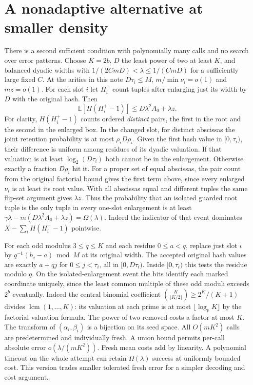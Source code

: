 \documentclass[11pt]{article}
\newcommand{\E}{\mathbb E}
\begin{document}
\section{A nonadaptive alternative at smaller density}
There is a second sufficient condition with polynomially many calls
and no search over error patterns. Choose $K=2b$, $D$ the least power
of two at least $K$, and balanced dyadic widths with
$1/(2CmD)<\lambda\le1/(CmD)$ for a sufficiently large fixed $C$.
At the arities in this note $D\tau_i\le M$, $m/\min\nu_i=o(1)$
and $mz=o(1)$. For each slot $i$ let $H_i^+$ count tuples after
enlarging just its width by $D$ with the original hash. Then
\[
 \E[H(H_i^+-1)]\le D\lambda^2 A_0+\lambda z .
\]
For clarity, $H(H_i^+-1)$ counts ordered \emph{distinct} pairs, the
first in the root and the second in the enlarged box. In the changed
slot, for distinct abscissas the joint retention probability is at
most $\rho_i D\rho_i$. Given the first hash value in $[0,\tau_i)$,
their difference is uniform among residues of its dyadic valuation.
If that valuation is at least $\log_2(D\tau_i)$ both cannot be in the
enlargement. Otherwise exactly a fraction $D\rho_i$ hit it. For a
proper set of equal abscissas, the pair count from the original
factorial bound gives the first term above, since every enlarged
$\nu_i$ is at least its root value. With all abscissas equal and
different tuples the same flip-set argument gives $\lambda z$.
Thus the probability that an isolated guarded root tuple is the
only tuple in every one-slot enlargement is at least
$\gamma\lambda-m(D\lambda^2 A_0+\lambda z)=\Omega(\lambda)$.
Indeed the indicator of that event dominates
$X-\sum_i H(H_i^+-1)$ pointwise.

For each odd modulus $3\le q\le K$ and each residue $0\le a<q$,
replace just slot $i$ by $q^{-1}(h_i-a)\bmod M$ at its original width.
The accepted original hash values are exactly $a+qj$ for
$0\le j<\tau_i$, all in $[0,D\tau_i)$. Inside $[0,\tau_i)$ this tests
the residue modulo $q$. On the isolated-enlargement event the bits
identify each marked coordinate uniquely, since the least common
multiple of these odd moduli exceeds $2^b$ eventually. Indeed the
central binomial coefficient $\binom K{\lfloor K/2\rfloor}\ge2^K/(K+1)$
divides $\operatorname{lcm}(1,\ldots,K)$: its valuation at each prime
is at most $\lfloor\log_p K\rfloor$ by the factorial valuation formula.
The power of two removed costs a factor at most $K$.
The transform of $(\alpha_i,\beta_i)$ is a bijection on its seed
space. All $O(mK^2)$ calls are predetermined and individually fresh.
A union bound permits per-call absolute error $o(\lambda/(mK^2))$.
Fresh mean costs add by linearity. A polynomial timeout on the whole
attempt can retain $\Omega(\lambda)$ success at uniformly bounded
cost. This version trades smaller tolerated fresh error for a simpler
decoding and cost argument.
\end{document}
